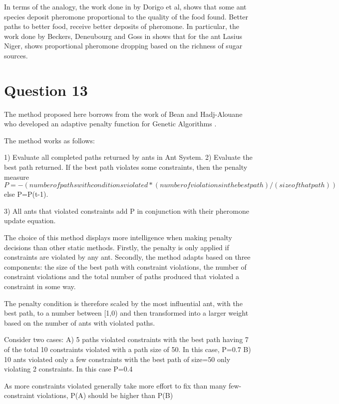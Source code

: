 \documentclass[12pt]{article}
\begin{document}
In terms of the analogy, the work done in \cite{Dorigo2000851} by Dorigo et al, shows that some ant species deposit pheromone proportional to the quality of the food found. Better paths to better food, receive better deposits of pheromone. In particular, the work done by Beckers, Deneubourg and Goss in \cite{beckers_deneubourg_goss_1993} shows that  
for the ant Lasius Niger, shows proportional pheromone dropping based on the richness of sugar sources.

\section{Question 13}
The method proposed here borrows from the work of Bean and Hadj-Alouane who developed an adaptive penalty function for Genetic Algorithms \cite{bean1992a-dual-genetic}.

The method works as follows:

	1) Evaluate all completed paths returned by ants in Ant System.
	2) Evaluate the best path returned. 
	If the best path violates some constraints, then the penalty measure 
	$P=-(number of paths with conditions violated * {(number of violations in the best path)/(size of that path)})$
	else P=P(t-1).

	3) All ants that violated constraints add P in conjunction with their pheromone update equation.

	The choice of this method displays more intelligence when making penalty decisions than other static methods. Firstly, the penalty is only applied if constraints are violated by any ant. Secondly, the method adapts based on three components: the size of the best path with constraint violations, the number of constraint violations and the total number of paths produced that violated a constraint in some way. 

	The penalty condition is therefore scaled by the most influential ant, with the best path, to a number between [1,0) and then transformed into a larger weight based on the number of ants with violated paths. 

	Consider two cases:
	A) 5 paths violated constraints with the best path having 7 of the total 10 constraints violated with a path size of 50. In this case, P=0.7
	B) 10 ants violated only a few constraints with the best path of size=50 only violating 2 constraints. In this case P=0.4

	As more constraints violated generally take more effort to fix than many few-constraint violations, P(A) should be higher than P(B)
\end{document}
